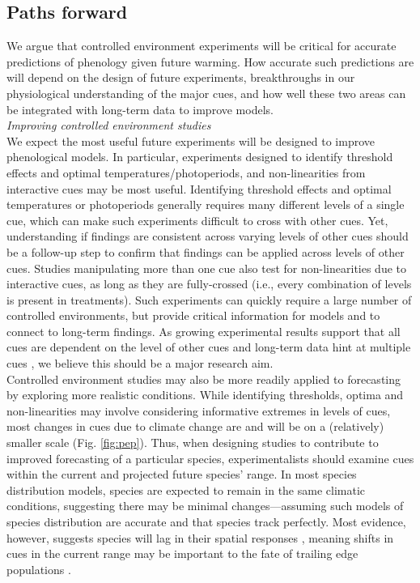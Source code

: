 \documentclass[11pt,letter]{article}
\begin{document}
\subsection{Paths forward} 
We argue that controlled environment experiments will be critical for accurate predictions of phenology given future warming. How accurate such predictions are will depend on the design of future experiments, breakthroughs in our physiological understanding of the major cues, and how well these two areas can be integrated with long-term data to improve models. \\

\emph{Improving controlled environment studies}\\
We expect the most useful future experiments will be designed to improve phenological models. In particular, experiments designed to identify threshold effects and optimal temperatures/photoperiods, and non-linearities from interactive cues may be most useful. Identifying threshold effects and optimal temperatures or photoperiods generally requires many different levels of a single cue, which can make such experiments difficult to cross with other cues. Yet, understanding if findings are consistent across varying levels of other cues should be a follow-up step to confirm that findings can be applied across levels of other cues. Studies manipulating more than one cue also test for non-linearities due to interactive cues, as long as they are fully-crossed (i.e., every combination of levels is present in treatments). Such experiments can quickly require a large number of controlled environments, but provide critical information for models and to connect to long-term findings. As growing experimental results support that all cues are dependent on the level of other cues \citep{stearns1958,flynn2018} and long-term data hint at multiple cues \citep{fu2015}, we believe this should be a major research aim.\\

Controlled environment studies may also be more readily applied to forecasting by exploring more realistic conditions. While identifying thresholds, optima and non-linearities may involve considering informative extremes in levels of cues, most changes in cues due to climate change are and will be on a (relatively) smaller scale (Fig. \ref{fig:pep}). Thus, when designing studies to contribute to improved forecasting of a particular species, experimentalists should examine cues within the current and projected future species' range. In most species distribution models, species are expected to remain in the same climatic conditions, suggesting there may be minimal changes---assuming such models of species distribution are accurate and that species track perfectly. Most evidence, however, suggests species will lag in their spatial responses \citep{Loarie:2009ax}, meaning shifts in cues in the current range may be important to the fate of trailing edge populations \citep{bertrand2011changes,lenoir2015climate,savage2015elevational}. \\ %
\end{document}
